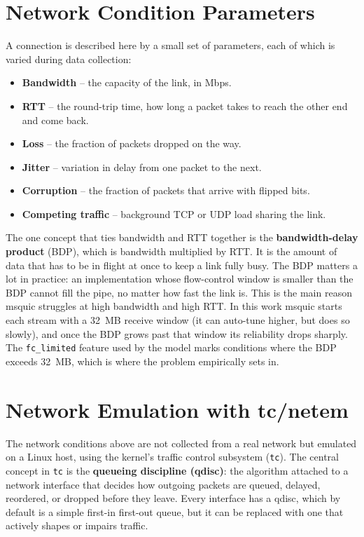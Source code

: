 \section{Network Condition Parameters}
\label{sec:bg-network-params}

A connection is described here by a small set of parameters, each of which is
varied during data collection:

\begin{itemize}
  \item \textbf{Bandwidth} -- the capacity of the link, in Mbps.
  \item \textbf{RTT} -- the round-trip time, how long a packet takes to reach
        the other end and come back.
  \item \textbf{Loss} -- the fraction of packets dropped on the way.
  \item \textbf{Jitter} -- variation in delay from one packet to the next.
  \item \textbf{Corruption} -- the fraction of packets that arrive with
        flipped bits.
  \item \textbf{Competing traffic} -- background TCP or UDP load sharing the
        link.
\end{itemize}

The one concept that ties bandwidth and RTT together is the
\textbf{bandwidth-delay product} (BDP), which is bandwidth multiplied by RTT. It is the amount of data
that has to be in flight at once to keep a link fully busy. The BDP matters a
lot in practice: an implementation whose flow-control window is smaller than
the BDP cannot fill the pipe, no matter how fast the link is. This is the main
reason msquic struggles at high bandwidth and high RTT. In this work msquic
starts each stream with a 32~MB receive window (it can auto-tune higher, but
does so slowly), and once the BDP grows past that window its reliability drops
sharply. The \texttt{fc\_limited} feature used by the model marks conditions
where the BDP exceeds 32~MB, which is where the problem empirically sets in.

\section{Network Emulation with tc/netem}
\label{sec:bg-netem}

The network conditions above are not collected from a real network but
emulated on a Linux host, using the kernel's traffic control subsystem
(\texttt{tc}). The central concept in \texttt{tc} is the \textbf{queueing
discipline (qdisc)}: the algorithm attached to a network interface that decides
how outgoing packets are queued, delayed, reordered, or dropped before they
leave. Every interface has a qdisc, which by default is a simple first-in
first-out queue, but it can be replaced with one that actively shapes or impairs
traffic.

